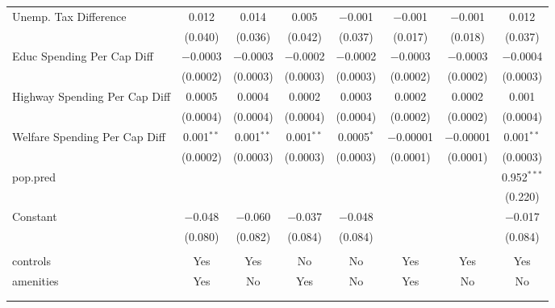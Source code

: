 \begin{table}[!htbp]
\begin{tabular}{@{\extracolsep{5pt}}lccccccc}
  Unemp. Tax Difference & 0.012 & 0.014 & 0.005 & $-$0.001 & $-$0.001 & $-$0.001 & 0.012 \\ 
  & (0.040) & (0.036) & (0.042) & (0.037) & (0.017) & (0.018) & (0.037) \\ 
  Educ Spending Per Cap Diff & $-$0.0003 & $-$0.0003 & $-$0.0002 & $-$0.0002 & $-$0.0003 & $-$0.0003 & $-$0.0004 \\ 
  & (0.0002) & (0.0003) & (0.0003) & (0.0003) & (0.0002) & (0.0002) & (0.0003) \\ 
  Highway Spending Per Cap Diff & 0.0005 & 0.0004 & 0.0002 & 0.0003 & 0.0002 & 0.0002 & 0.001 \\ 
  & (0.0004) & (0.0004) & (0.0004) & (0.0004) & (0.0002) & (0.0002) & (0.0004) \\ 
  Welfare Spending Per Cap Diff & 0.001$^{**}$ & 0.001$^{**}$ & 0.001$^{**}$ & 0.0005$^{*}$ & $-$0.00001 & $-$0.00001 & 0.001$^{**}$ \\ 
  & (0.0002) & (0.0003) & (0.0003) & (0.0003) & (0.0001) & (0.0001) & (0.0003) \\ 
  pop.pred &  &  &  &  &  &  & 0.952$^{***}$ \\ 
  &  &  &  &  &  &  & (0.220) \\ 
  Constant & $-$0.048 & $-$0.060 & $-$0.037 & $-$0.048 &  &  & $-$0.017 \\ 
  & (0.080) & (0.082) & (0.084) & (0.084) &  &  & (0.084) \\ 
 \hline \\[-1.8ex] 
controls & Yes & Yes & No & No & Yes & Yes & Yes \\ 
amenities & Yes & No & Yes & No & Yes & No & No \\ 
\hline \\[-1.8ex] 
\hline 
\hline \\[-1.8ex] 
\end{tabular} 
\end{table} 
